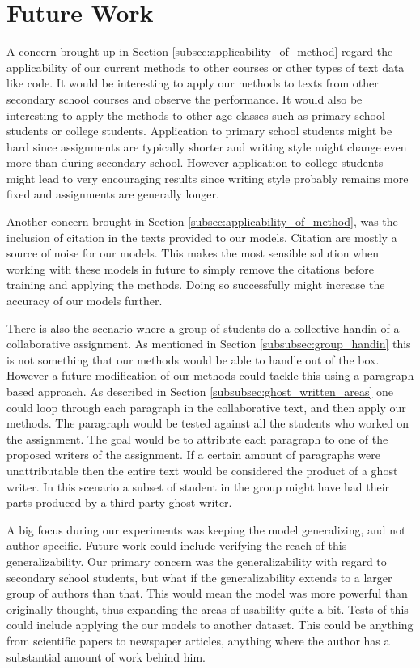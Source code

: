 \section{Future Work} \label{sec:future_work}

A concern brought up in Section \ref{subsec:applicability_of_method} regard
the applicability of our current methods to other courses or other types of
text data like code. It would be interesting to apply our methods to texts from
other secondary school courses and observe the performance. It would also be
interesting to apply the methods to other age classes such as primary school
students or college students. Application to primary school students might be
hard since assignments are typically shorter and writing style might change even
more than during secondary school. However application to college students might
lead to very encouraging results since writing style probably remains more fixed
and assignments are generally longer.

Another concern brought in Section \ref{subsec:applicability_of_method}, was
the inclusion of citation in the texts provided to our models. Citation are
mostly a source of noise for our models. This makes the most sensible solution
when working with these models in future to simply remove the citations before
training and applying the methods. Doing so successfully might increase the
accuracy of our models further.

There is also the scenario where a group of students do a collective handin of a
collaborative assignment. As mentioned in Section \ref{subsubsec:group_handin}
this is not something that our methods would be able to handle out of the box.
However a future modification of our methods could tackle this using a paragraph
based approach. As described in Section \ref{subsubsec:ghost_written_areas} one
could loop through each paragraph in the collaborative text, and then apply
our methods. The paragraph would be tested against all the students who worked
on the assignment. The goal would be to attribute each paragraph to one of the
proposed writers of the assignment. If a certain amount of paragraphs were
unattributable then the entire text would be considered the product of a ghost
writer. In this scenario a subset of student in the group might have had their
parts produced by a third party ghost writer.

A big focus during our experiments was keeping the model generalizing, and
not author specific. Future work could include verifying the reach of this
generalizability. Our primary concern was the generalizability with regard to
secondary school students, but what if the generalizability extends to a larger
group of authors than that. This would mean the model was more powerful than
originally thought, thus expanding the areas of usability quite a bit. Tests
of this could include applying the our models to another dataset. This could
be anything from scientific papers to newspaper articles, anything where the
author has a substantial amount of work behind him.

